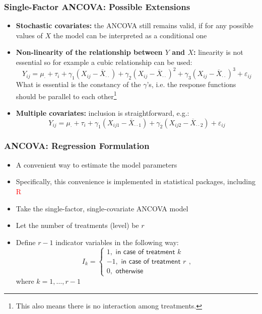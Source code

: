 \documentclass[10pt]{beamer}
\theoremstyle{definition}
\begin{document}
\begin{frame}[fragile]
\frametitle{Single-Factor ANCOVA: Possible Extensions}
\begin{itemize}
	\item \textbf{Stochastic covariates:} the ANCOVA still remains valid, if for any possible values of $X$ the model can be interpreted as a conditional one
	\item \textbf{Non-linearity of the relationship between $Y$ and $X$:} linearity is not essential so for example a cubic relationship can be used:
	\[
		Y_{ij} = \mu_{\cdot} + \tau_{i} + \gamma_{1} (X_{ij} - \overline{X}_{\cdot\cdot})  + \gamma_{2} (X_{ij} - \overline{X}_{\cdot\cdot})^{2} + \gamma_{3} (X_{ij} - \overline{X}_{\cdot\cdot})^{3} + \varepsilon_{ij}
	\]
	What is essential is the constancy of the $\gamma$'s, i.e. the response functions should be parallel to each other\footnote{This also means there is no interaction among treatments.}
	\item \textbf{Multiple covariates:} inclusion is straightforward, e.g.:
	\[
		Y_{ij} = \mu_{\cdot} + \tau_{i} + \gamma_{1} (X_{ij1} - \overline{X}_{\cdot\cdot1})  + \gamma_{2} (X_{ij2} - \overline{X}_{\cdot\cdot2}) + \varepsilon_{ij}
	\]
\end{itemize}
\end{frame}

\begin{frame}[fragile]
\frametitle{ANCOVA: Regression Formulation}
\begin{itemize}
	\item A convenient way to estimate the model parameters
	\item Specifically, this convenience is implemented in statistical packages, including \textcolor{red}{R}
	\item Take the single-factor, single-covariate ANCOVA model
	\item Let the number of treatments (level) be $r$
	\item Define $r-1$ indicator variables in the following way:
	\[
		I_{k} = \left\{
		\begin{array}{lcl}
			1, \textsf{ in case of treatment } k\\
			-1, \textsf{ in case of treatment } r\\
			0,\textsf{ otherwise}
		\end{array}
		\right.,
	\]
	where $k = 1,\ldots,r-1$
\end{itemize}
\end{frame}
\end{document}
